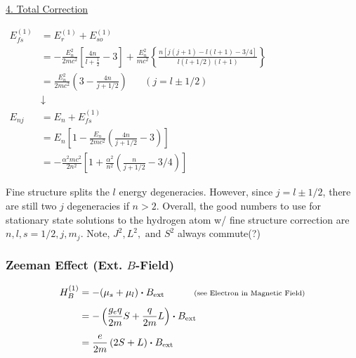 \documentclass[12pt]{article}
\newcommand*{\dotP}{\boldsymbol \cdot}	%
\begin{document}
\vspace{20pt}\noindent
\underline{4. Total Correction}\\[15pt]
\begin{minipage}{.5\textwidth}
    \(\begin{aligned}
        E^{(1)}_{fs} &= E^{(1)}_r + E^{(1)}_{so} \\[5pt]
        &= - \frac{E_n^2}{2mc^2} \left[ \frac{4n}{l + \tfrac{1}{2}} - 3\right] + \frac{E_n^2}{mc^2} 
            \left\{ \frac{ n \left[ j(j+1) - l(l+1) - 3/4 \right] }{ l (l+1/2) (l+1) } \right\}\\[5pt]
        &= \frac{E_n^2}{2mc^2} \left( 3 - \frac{4n}{j + 1/2} \right) 
            \hspace{20pt} {\scriptstyle(j = l \pm 1/2)}\\
        &\downarrow\\
        E_{nj} &= E_n + E^{(1)}_{fs}\\[5pt]
        &= E_n \left[ 1 
            - \frac{E_n}{2mc^2} \left( \frac{4n}{j + 1/2} - 3 \right) \right]\\[5pt]
        &= -\frac{\alpha^2 mc^2}{2n^2} \left[ 1 
            + \frac{\alpha^2}{n^2} \left( \frac{n}{j + 1/2} - 3/4 \right) \right]
    \end{aligned}\) 
\end{minipage}
\begin{minipage}{.5\textwidth}
    \vspace{3cm}
    Fine structure splits the \(l\) energy degeneracies. However, since \(j = l \pm 1/2\), there are still two \(j\)
    degeneracies if \(n>2\). Overall, the good numbers to use for stationary state
    solutions to the hydrogen atom w/ fine structure correction are \(n, l, s{\scriptstyle=1/2}, j, m_j\). Note, 
    \(J^2, L^2, \text{ and } S^2\) always commute(?)
\end{minipage}


\newpage
\subsubsection{Zeeman Effect (Ext. \(B\)-Field)}
\begin{align*}
    H_B^{(1)} &= - (\mu_s + \mu_l) \dotP B_\text{ext}
        \indent\indent \text{\scriptsize(see Electron in Magnetic Field)}\\[5pt]
    &= - \left( \frac{g_e q}{2m}S + \frac{q}{2m}L \right) \dotP B_\text{ext}\\[5pt]
    &= \frac{e}{2m} \left( 2S + L \right) \dotP B_\text{ext}
\end{align*}
\end{document}
